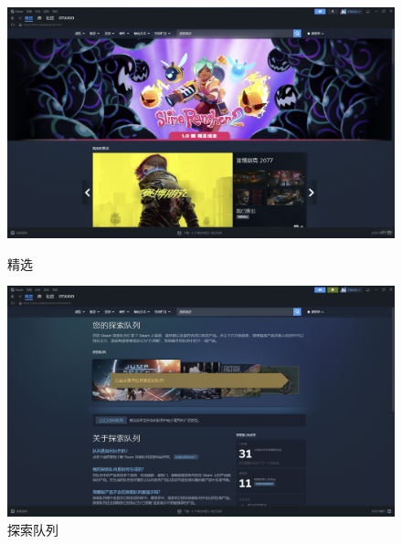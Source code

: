 \documentclass{article}
\begin{document}
        \begin{figure}[H]
            \centering
            \begin{minipage}{0.48\textwidth}
                \centering
                \includegraphics[width=\linewidth]{图/Steam主页.png}
                \caption{精选}
                \label{fig:精选}
            \end{minipage}
            \hfill
            \begin{minipage}{0.48\textwidth}
                \centering
                \includegraphics[width=\linewidth]{图/探索队列.png}
                \caption{探索队列}
                \label{fig:探索队列}
            \end{minipage}
        \end{figure}
        
\end{document}
